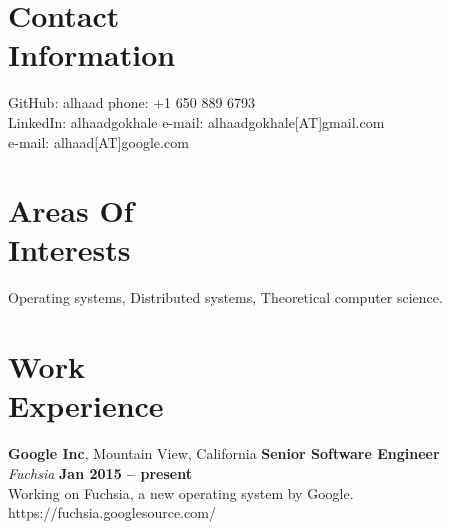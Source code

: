\documentclass[margin,line]{resume}
\begin{document}
\begin{resume}

    \section{\mysidestyle Contact\\Information}

    GitHub: alhaad                            \hfill phone: +1 650 889 6793          \vspace{0mm}\\\vspace{0mm}%
    LinkedIn: alhaadgokhale                          \hfill e-mail: alhaadgokhale[AT]gmail.com          \vspace{0mm}\\\vspace{0mm}%
    \hfill e-mail: alhaad[AT]google.com  \vspace{0mm}\\\vspace{-4.5mm}%


    \section{\mysidestyle Areas Of\\Interests}

    Operating systems, Distributed systems, Theoretical computer science.

    \section{\mysidestyle Work\\Experience}

    \textbf{Google Inc}, Mountain View, California \hfill \textbf{Senior Software Engineer} \vspace{2mm}\\\vspace{1mm}%
    \textsl{Fuchsia} \hfill \textbf{Jan 2015 -- present}\\
    Working on Fuchsia, a new operating system by Google.
    https://fuchsia.googlesource.com/


\end{resume}
\end{document}
